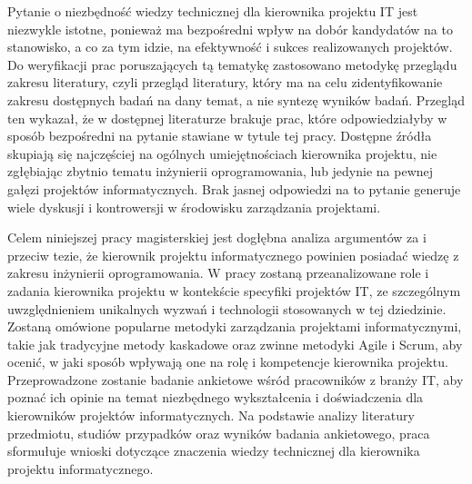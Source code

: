 Pytanie o niezbędność wiedzy technicznej dla kierownika projektu IT jest niezwykle istotne, ponieważ ma bezpośredni wpływ na dobór kandydatów na to stanowisko, a co za tym idzie, na efektywność i sukces realizowanych projektów. Do weryfikacji prac poruszających tą tematykę zastosowano metodykę przeglądu zakresu literatury, czyli przegląd literatury, który ma na celu zidentyfikowanie zakresu dostępnych badań na dany temat, a nie syntezę wyników badań. \autocite{metodyka} Przegląd ten wykazał, że w dostępnej literaturze brakuje prac, które odpowiedziałyby w sposób bezpośredni na pytanie stawiane w tytule tej pracy. Dostępne źródła skupiają się najczęściej na ogólnych umiejętnościach kierownika projektu, nie zgłębiając zbytnio tematu inżynierii oprogramowania, lub jedynie na pewnej gałęzi projektów informatycznych. \autocite{data} Brak jasnej odpowiedzi na to pytanie generuje wiele dyskusji i kontrowersji w środowisku zarządzania projektami.

Celem niniejszej pracy magisterskiej jest dogłębna analiza argumentów za i przeciw tezie, że kierownik projektu informatycznego powinien posiadać wiedzę z zakresu inżynierii oprogramowania.
W pracy zostaną przeanalizowane role i zadania kierownika projektu w kontekście specyfiki projektów IT, ze szczególnym uwzględnieniem unikalnych wyzwań i technologii stosowanych w tej dziedzinie.
Zostaną omówione popularne metodyki zarządzania projektami informatycznymi, takie jak tradycyjne metody kaskadowe oraz zwinne metodyki Agile i Scrum, aby ocenić, w jaki sposób wpływają one na rolę i kompetencje kierownika projektu.
Przeprowadzone zostanie badanie ankietowe wśród pracowników z branży IT, aby poznać ich opinie na temat niezbędnego wykształcenia i doświadczenia dla kierowników projektów informatycznych.
Na podstawie analizy literatury przedmiotu, studiów przypadków oraz wyników badania ankietowego, praca sformułuje wnioski dotyczące znaczenia wiedzy technicznej dla kierownika projektu informatycznego.